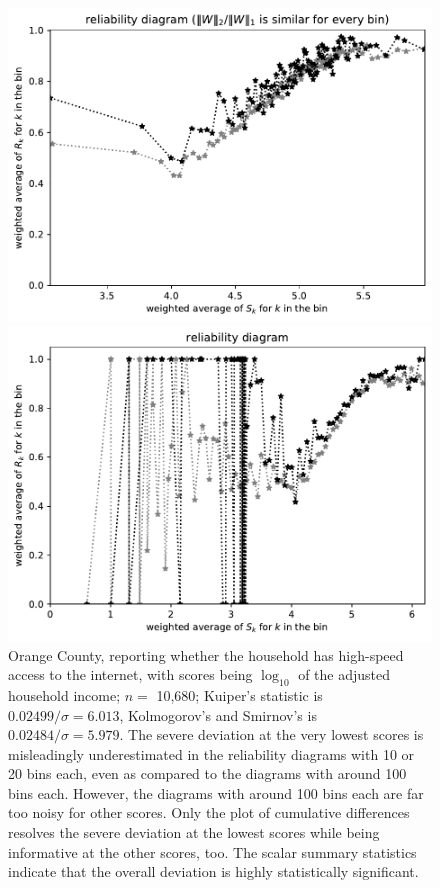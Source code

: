 \documentclass{article}
\begin{document}
\begin{figure}
\begin{centering}
\parbox{\imsize}{\includegraphics[width=\imsize]
{./codes/weighted/County_of_Orange-HISPEED/equierrs100}}
\quad\quad
\parbox{\imsize}{\includegraphics[width=\imsize]
{./codes/weighted/County_of_Orange-HISPEED/equiscores100}}

\end{centering}
\caption{Orange County, reporting whether the household has high-speed access
         to the internet, with scores being $\log_{10}$
         of the adjusted household income; $n =$ 10,680;
         Kuiper's statistic is $0.02499 / \sigma = 6.013$,
         Kolmogorov's and Smirnov's is $0.02484 / \sigma = 5.979$.
The severe deviation at the very lowest scores
is misleadingly underestimated in the reliability diagrams
with 10 or 20 bins each, even as compared to the diagrams
with around 100 bins each. However, the diagrams with around 100 bins each
are far too noisy for other scores. Only the plot of cumulative differences
resolves the severe deviation at the lowest scores while being informative
at the other scores, too. The scalar summary statistics indicate
that the overall deviation is highly statistically significant.
}
\label{orange}
\end{figure}
\end{document}
